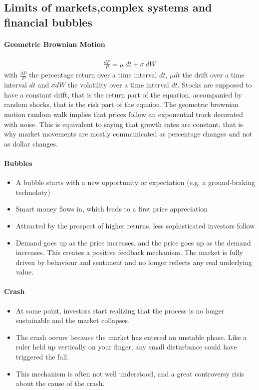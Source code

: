 \subsection{Limits of markets,complex systems and financial bubbles}

\paragraph{Geometric Brownian Motion}
\begin{align*}
    \frac{dP}{P} = \mu \ dt + \sigma \ dW
\end{align*}
with $\frac{dP}{P}$ the percentage return over a time interval $dt$,
$\mu dt$ the drift over a time interval $dt$ and $\sigma dW$ the volatility
over a time interval $dt$. Stocks are supposed to have a constant drift, that
is the return part of the equation, accompanied by random shocks, that is the
risk part of the equaion. The geometric brownian motion random walk implies
that prices follow an exponential track decorated with noise. This is
equivalent to saying that growth rates are constant, that is why market
movements are mostly communicated as percentage changes and not as
dollar changes.

\paragraph{Bubbles}
\begin{itemize}
    \item A bubble starts with a new opportunity or expectation (e.g. a ground-braking
        technoloty)
    \item Smart money flows in, which leads to a first price appreciation
    \item Attracted by the prospect of higher returns, less sophisticated investors follow
    \item Demand goes up as the price increases, and the price goes up as the demand
        increases. This creates a positive feedback mechanism. The market is fully
        driven by behaviour and sentiment and no longer reflects any real
        underlying value.
\end{itemize}

\paragraph{Crash}
\begin{itemize}
    \item At some point, investors start realizing that the process is no
        longer sustainable and the market collapses.
    \item The crash occurs because the market has entered an unstable phase.
        Like a ruler held up vertically on your finger, any small disturbance
        could have triggered the fall.
    \item This mechanism is often not well understood, and a great controversy
        risis about the cause of the crash.
\end{itemize}

